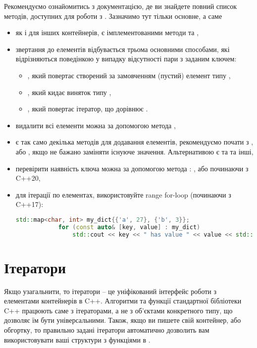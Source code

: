 \documentclass[12pt]{article}
\begin{document}
	Рекомендуємо ознайомитись з документацією, де ви знайдете повний список методів, доступних для роботи з . Зазначимо тут тільки основне, а саме
	\begin{itemize}
		\item як і для інших контейнерів, є імплементованими методи  та ,
		\item звертання до елементів відбувається трьома основними способами, які відрізняються поведінкою у випадку відсутності пари з заданим ключем:
		\begin{itemize}
			\item \href{https://en.cppreference.com/w/cpp/container/map/operator_at}{}, який повертає створений за замовченням (пустий) елемент типу ,
			\item \href{https://en.cppreference.com/w/cpp/container/map/at}{}, який кидає виняток типу ,
			\item \href{https://en.cppreference.com/w/cpp/container/map/find}{}, який повертає ітератор, що дорівнює .
		\end{itemize}
		\item видалити всі елементи можна за допомогою метода ,
		\item є так само декілька методів для додавання елементів, рекомендуємо почати з \href{https://en.cppreference.com/w/cpp/container/map/emplace}{}, або \href{https://en.cppreference.com/w/cpp/container/map/try_emplace}{}, якщо не бажано заміняти існуюче значення. Альтернативою є \href{https://en.cppreference.com/w/cpp/container/map/operator_at}{} та \href{https://en.cppreference.com/w/cpp/container/map/insert}{} та інші,
		\item перевірити наявність ключа можна за допомогою метода \href{https://en.cppreference.com/w/cpp/container/map/count}{}: , або  починаючи з C++20,
		\item для ітерації по елементах, використовуйте range for-loop (починаючи з C++17):
		\begin{lstlisting}[language=c++]
			std::map<char, int> my_dict{{'a', 27}, {'b', 3}}; 
			for (const auto& [key, value] : my_dict)
				std::cout << key << " has value " << value << std::endl;
		\end{lstlisting}
	\end{itemize}
	
	\section{Ітератори}
	Якщо узагальнити, то ітератори -- це уніфікований інтерфейс роботи з елементами контейнерів в C++. Алгоритми та функції стандартної бібліотеки C++ працюють саме з ітераторами, а не з об'єктами конкретного типу, що дозволяє їм бути універсальними. Також, якщо ви пишете свій контейнер, або обгортку, то правильно задані ітератори автоматично дозволить вам використовувати ваші структури з функціями в .
\end{document}
